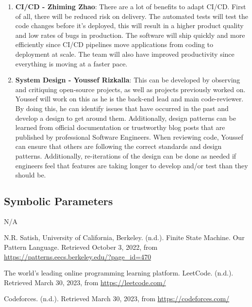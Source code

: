 \documentclass[12pt, titlepage]{article}
\begin{document}
\begin{enumerate}
\item \textbf{CI/CD - Zhiming Zhao}: There are a lot of benefits to adapt CI/CD. First of all, there will be reduced risk on delivery. The automated tests will test the code changes before it's deployed, this will result in a higher product quality and low rates of bugs in production. The software will ship quickly and more efficiently since CI/CD pipelines move applications from coding to deployment at scale. The team will also have improved productivity since everything is moving at a faster pace.

\item\textbf{System Design - Youssef Rizkalla}: This can be developed by observing and critiquing open-source projects, as well as projects previously worked on. Youssef will work on this as he is the back-end lead and main code-reviewer. By doing this, he can identify issues that have occurred in the past and develop a design to get around them. Additionally, design patterns can be learned from official documentation or trustworthy blog posts that are published by professional Software Engineers. When reviewing code, Youssef can ensure that others are following the correct standards and design patterns. Additionally, re-iterations of the design can be done as needed if engineers feel that features are taking longer to develop and/or test than they should be.

\end{enumerate}

\subsection{Symbolic Parameters}
N/A


\begin{thebibliography}{9}
N.R. Satish, University of California, Berkeley. (n.d.). Finite State Machine. Our Pattern Language. Retrieved October 3, 2022, from \href{https://patterns.eecs.berkeley.edu/?page_id=470}{https://patterns.eecs.berkeley.edu/?page\_id=470} 

The world's leading online programming learning platform. LeetCode. (n.d.). Retrieved March 30, 2023, from \href{from https://leetcode.com/}{https://leetcode.com/} 

Codeforces. (n.d.). Retrieved March 30, 2023, from  \href{https://codeforces.com/}{https://codeforces.com/} 
\end{thebibliography}
\end{document}

